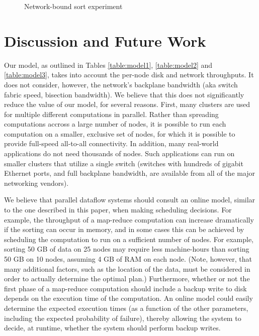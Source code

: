 \documentclass[ 11pt, letterpaper]{article}%
\begin{document}
\begin{figure}
\begin{center}
\caption{Network-bound sort experiment}
\label{fig:sort100experiment}
\end{center}
\end{figure}

\section{Discussion and Future Work}\label{sec:discussion}

Our model, as outlined in Tables \ref{table:model1}, \ref{table:model2} and
\ref{table:model3}, takes into account the per-node disk and network
throughputs. It does not consider, however, the network's backplane
bandwidth (aka switch fabric speed, bisection bandwidth). We believe that this
does not significantly reduce the value of our model, for several reasons.
First, many clusters are used for multiple different computations in parallel. Rather than spreading computations accross a large
  number of nodes, it is possible to run each computation on a smaller,
  exclusive set of nodes, for which it is possible to provide full-speed
  all-to-all connectivity. In addition, many real-world applications do not need
  thousands of nodes. Such applications can run on smaller clusters that utilize a single switch
  (switches with hundreds of gigabit Ethernet ports, and full backplane
  bandwidth, are available from all of the major networking vendors).
  
We believe that parallel dataflow systems should consult an online model,
similar to the one described in this paper, when making scheduling decisions.
For example, the throughput of a map-reduce computation can increase
dramatically if the sorting can occur in memory, and in some cases this can be
achieved by scheduling the computation to run on a sufficient number of
nodes. For example, sorting 50 GB of data on 25 nodes may require
less machine-hours than sorting 50 GB on 10 nodes, assuming 4 GB of
RAM on each node. (Note, however, that many additional factors, such as the
location of the data, must be considered in order to actually determine the
optimal plan.) Furthermore, whether or not the first phase of a map-reduce
computation should include a backup write to disk depends on the execution time of the computation. An online model could easily determine the expected execution times (as a function of the other parameters, including the expected probability of failure), thereby allowing the system to decide, at runtime, whether the system should perform backup writes.
\end{document}
